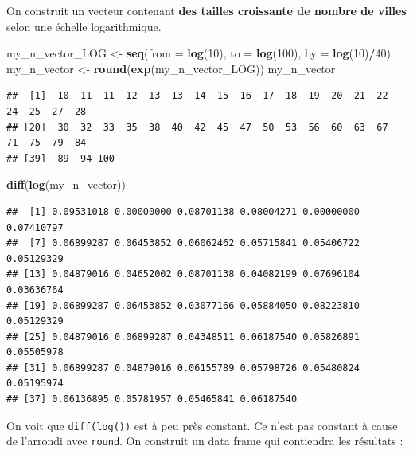\documentclass[
]{article}
\newenvironment{Shaded}{\begin{snugshade}}{\end{snugshade}}
\newcommand{\AttributeTok}[1]{\textcolor[rgb]{0.13,0.29,0.53}{#1}}
\newcommand{\DecValTok}[1]{\textcolor[rgb]{0.00,0.00,0.81}{#1}}
\newcommand{\FunctionTok}[1]{\textcolor[rgb]{0.13,0.29,0.53}{\textbf{#1}}}
\newcommand{\NormalTok}[1]{#1}
\newcommand{\OtherTok}[1]{\textcolor[rgb]{0.56,0.35,0.01}{#1}}
\newcommand{\SpecialCharTok}[1]{\textcolor[rgb]{0.81,0.36,0.00}{\textbf{#1}}}
\begin{document}
On construit un vecteur contenant \textbf{des tailles croissante de
nombre de villes} selon une échelle logarithmique.

\begin{Shaded}
\begin{Highlighting}[]
\NormalTok{my\_n\_vector\_LOG }\OtherTok{\textless{}{-}} \FunctionTok{seq}\NormalTok{(}\AttributeTok{from =} \FunctionTok{log}\NormalTok{(}\DecValTok{10}\NormalTok{), }\AttributeTok{to =} \FunctionTok{log}\NormalTok{(}\DecValTok{100}\NormalTok{), }\AttributeTok{by =} \FunctionTok{log}\NormalTok{(}\DecValTok{10}\NormalTok{)}\SpecialCharTok{/}\DecValTok{40}\NormalTok{)}
\NormalTok{my\_n\_vector }\OtherTok{\textless{}{-}} \FunctionTok{round}\NormalTok{(}\FunctionTok{exp}\NormalTok{(my\_n\_vector\_LOG))}
\NormalTok{my\_n\_vector}
\end{Highlighting}
\end{Shaded}

\begin{verbatim}
##  [1]  10  11  11  12  13  13  14  15  16  17  18  19  20  21  22  24  25  27  28
## [20]  30  32  33  35  38  40  42  45  47  50  53  56  60  63  67  71  75  79  84
## [39]  89  94 100
\end{verbatim}

\begin{Shaded}
\begin{Highlighting}[]
\FunctionTok{diff}\NormalTok{(}\FunctionTok{log}\NormalTok{(my\_n\_vector))}
\end{Highlighting}
\end{Shaded}

\begin{verbatim}
##  [1] 0.09531018 0.00000000 0.08701138 0.08004271 0.00000000 0.07410797
##  [7] 0.06899287 0.06453852 0.06062462 0.05715841 0.05406722 0.05129329
## [13] 0.04879016 0.04652002 0.08701138 0.04082199 0.07696104 0.03636764
## [19] 0.06899287 0.06453852 0.03077166 0.05884050 0.08223810 0.05129329
## [25] 0.04879016 0.06899287 0.04348511 0.06187540 0.05826891 0.05505978
## [31] 0.06899287 0.04879016 0.06155789 0.05798726 0.05480824 0.05195974
## [37] 0.06136895 0.05781957 0.05465841 0.06187540
\end{verbatim}

On voit que \texttt{diff(log())} est à peu près constant. Ce n'est pas
constant à cause de l'arrondi avec \texttt{round}. On construit un data
frame qui contiendra les résultats :
\end{document}
